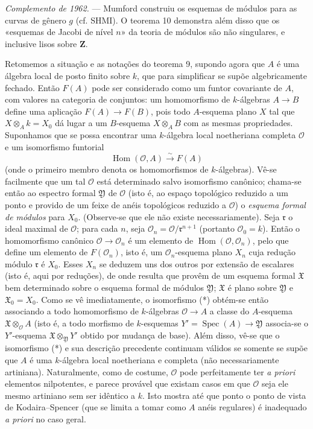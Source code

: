 \documentclass[11pt,twoside,openany]{book}
\numberwithin{equation}{section}
\newcommand{\src}[1]{%
  \phantomsection\hypertarget{src:#1}{}%
  \marginpar{\raggedleft\footnotesize\sffamily #1}%
}
\theoremstyle{plain}
\theoremstyle{definition}
\theoremstyle{remark}
\newcommand{\FgaUnitKey}{frontmatter}
\renewcommand{\src}[1]{%
  \phantomsection\hypertarget{src:\FgaUnitKey:#1}{}%
  \marginpar{\raggedleft\footnotesize\sffamily #1}%
}
\begin{document}
\emph{Complemento de 1962.} --- Mumford construiu os esquemas de módulos
para as curvas de gênero $g$ (cf. SHMI). O teorema 10 demonstra além disso que
os «esquemas de Jacobi de nível $n$» da teoria de módulos são não singulares,
e inclusive lisos sobre $\mathbf Z$.

\src{208}
Retomemos a situação e as notações do teorema 9, supondo agora que $A$
é uma álgebra local de posto finito sobre $k$, que para simplificar se supõe
algebricamente fechado. Então $F(A)$ pode ser considerado como um funtor
covariante de $A$, com valores na categoria de conjuntos: um homomorfismo de
$k$-álgebras $A\longrightarrow B$ define uma aplicação
$F(A)\longrightarrow F(B)$, pois todo $A$-esquema plano $X$ tal que
$X\otimes_A k=X_0$ dá lugar a um $B$-esquema $X\otimes_A B$ com as mesmas
propriedades. Suponhamos que se possa encontrar uma $k$-álgebra local noetheriana
completa $\mathcal O$ e um isomorfismo funtorial
\begin{equation}
  \tag{*}
  \operatorname{Hom}(\mathcal O,A)\xrightarrow{\sim}F(A)
\end{equation}
(onde o primeiro membro denota os homomorfismos de $k$-álgebras). Vê-se
facilmente que um tal $\mathcal O$ está determinado salvo isomorfismo canônico;
chama-se então ao espectro formal $\mathfrak Y$ de $\mathcal O$ (isto é,
ao espaço topológico reduzido a um ponto e provido de um feixe de anéis
topológicos reduzido a $\mathcal O$) o \emph{esquema formal de módulos} para
$X_0$. (Observe-se que ele não existe necessariamente). Seja $\mathfrak r$ o ideal
maximal de $\mathcal O$; para cada $n$, seja
$\mathcal O_n=\mathcal O/\mathfrak r^{n+1}$ (portanto $\mathcal O_0=k$).
Então o homomorfismo canônico $\mathcal O\longrightarrow\mathcal O_n$ é um
elemento de $\operatorname{Hom}(\mathcal O,\mathcal O_n)$, pelo que define um
elemento de $F(\mathcal O_n)$, isto é, um $\mathcal O_n$-esquema plano $X_n$
cuja redução módulo $\mathfrak r$ é $X_0$. Esses $X_n$ se deduzem uns dos
outros por extensão de escalares (isto é, aqui por reduções), de onde
resulta que provêm de um esquema formal $\mathfrak X$ bem determinado sobre
o esquema formal de módulos $\mathfrak Y$; $\mathfrak X$ é plano sobre
$\mathfrak Y$ e $\mathfrak X_0=X_0$. Como se vê imediatamente, o isomorfismo (*)
obtém-se então associando a todo homomorfismo de $k$-álgebras
$\mathcal O\longrightarrow A$ a classe do $A$-esquema
$\mathfrak X\otimes_{\mathcal O}A$ (isto é, a todo morfismo de $k$-esquemas
$Y'=\operatorname{Spec}(A)\longrightarrow\mathfrak Y$ associa-se o
$Y'$-esquema $\mathfrak X\otimes_{\mathfrak Y}Y'$ obtido por mudança de base).
Além disso, vê-se que o isomorfismo (*) e sua descrição precedente continuam
válidos se somente se supõe que $A$ é uma $k$-álgebra local noetheriana e
completa (não necessariamente artiniana). Naturalmente, como de costume,
$\mathcal O$ pode perfeitamente ter \textit{a priori} elementos nilpotentes,
e parece provável que existam casos em que $\mathcal O$ seja ele mesmo artiniano
sem ser idêntico a $k$. Isto mostra até que ponto o ponto de vista de
Kodaira--Spencer (que se limita a tomar como $A$ anéis regulares) é
inadequado \textit{a priori} no caso geral.
\end{document}

